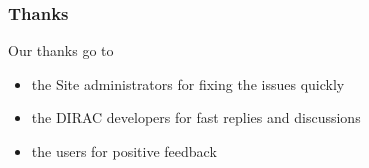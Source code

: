 \documentclass[10pt,table,dvipsnames]{beamer}
\begin{document}
\begin{frame}
\frametitle{Thanks}

Our thanks go to 
\begin{itemize}
\item the Site administrators for fixing the issues quickly
\item the DIRAC developers for fast replies and discussions
\item the users for positive feedback
\end{itemize}

\label{lastframe}
\end{frame} 
\end{document}
